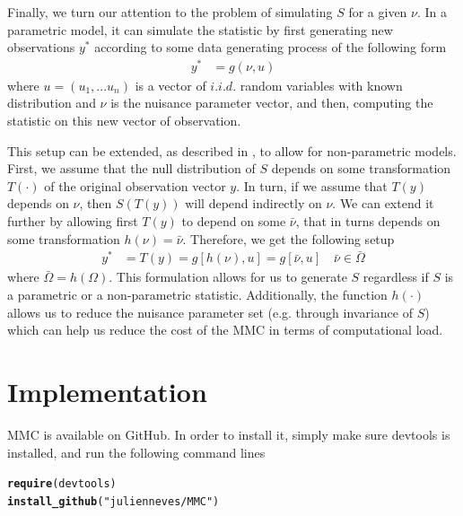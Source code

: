\documentclass[11pt]{article}\usepackage[]{graphicx}\usepackage[]{color}
\makeatletter
\newcommand{\hlstr}[1]{\textcolor[rgb]{0.192,0.494,0.8}{#1}}%
\newcommand{\hlstd}[1]{\textcolor[rgb]{0.345,0.345,0.345}{#1}}%
\newcommand{\hlkwd}[1]{\textcolor[rgb]{0.737,0.353,0.396}{\textbf{#1}}}%
\newenvironment{kframe}{%
 \def\at@end@of@kframe{}%
 \ifinner\ifhmode%
  \def\at@end@of@kframe{\end{minipage}}%
  \begin{minipage}{\columnwidth}%
 \fi\fi%
 \def\FrameCommand##1{\hskip\@totalleftmargin \hskip-\fboxsep
 \colorbox{shadecolor}{##1}\hskip-\fboxsep
     \hskip-\linewidth \hskip-\@totalleftmargin \hskip\columnwidth}%
 \MakeFramed {\advance\hsize-\width
   \@totalleftmargin\z@ \linewidth\hsize
   \@setminipage}}%
 {\par\unskip\endMakeFramed%
 \at@end@of@kframe}
\newenvironment{knitrout}{}{} %
\newcommand{\pkg}[1]{{\normalfont\fontseries{b}\selectfont #1}}
\makeatother
\begin{document}
Finally, we turn our attention to the problem of simulating $S$ for a given $\nu$. In a parametric model, it can simulate the statistic by first generating new observations $y^*$ according to some data generating process of the following form
\begin{align}
	y^* & = g(\nu,u)
\end{align}
where $u=(u_1,...u_n)$ is a vector of $i.i.d.$ random variables with known distribution and $\nu$ is the nuisance parameter vector, and then, computing the statistic on this new vector of observation.

 This setup can be extended, as described in \cite{dufour_monte_2006}, to allow for non-parametric models. First, we assume that the null distribution of $S$ depends on some transformation $T(\cdot)$ of the original observation vector $y$. In turn, if we assume that $T(y)$ depends on $\nu$, then $S(T(y))$ will depend indirectly on $\nu$. We can extend it further by allowing first $T(y)$ to depend on some $\bar{\nu}$, that in turns depends on some transformation $h(\nu)=\bar{\nu}$. Therefore, we get the following setup
 \begin{align}
 	y^* & = T(y) = g[h(\nu), u] = g[\bar{\nu},u] \quad \bar{\nu} \in \bar{\Omega}
 \end{align}
 where $\bar{\Omega}=h(\Omega)$. This formulation allows for us to generate $S$ regardless if $S$ is a parametric or a non-parametric statistic. Additionally, the function $h(\cdot)$ allows us to reduce the nuisance parameter set (e.g. through invariance of $S$) which can help us reduce the cost of the MMC in terms of computational load.




\section{Implementation}

\pkg{MMC} is available on GitHub. In order to install it, simply make sure \pkg{devtools} \citep{wickham_devtools:_2016} is installed, and run the following command lines
\begin{knitrout}
\color{fgcolor}\begin{kframe}
\begin{alltt}
\hlkwd{require}\hlstd{(devtools)}
\hlkwd{install_github}\hlstd{(}\hlstr{"julienneves/MMC"}\hlstd{)}
\end{alltt}
\end{kframe}
\end{knitrout}
\end{document}
